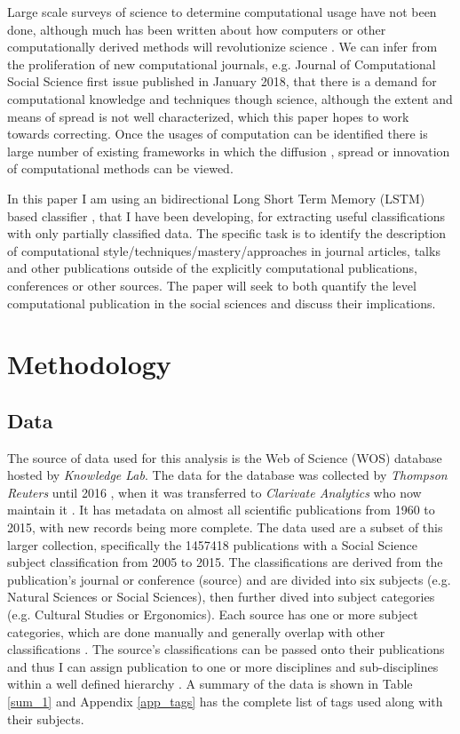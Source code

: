 \documentclass[12pt, a4paper]{article}
\begin{document}
Large scale surveys of science to determine computational usage have not been done, although much has been written about how computers or other computationally derived methods will revolutionize science \citep[e.g.][]{de1997computer, anderson2008end,  provost2013data, john2014big}. We can infer from the proliferation of new computational journals, e.g. Journal of Computational Social Science first issue published in January 2018, that there is a demand for computational knowledge and techniques though science, although the extent and means of spread is not well characterized, which this paper hopes to work towards correcting. Once the usages of computation can be identified there is large number of existing frameworks in which the diffusion \citep{griliches1960hybrid}, spread \citep{padgett1993robust} or innovation \citep{foster2015tradition} of computational methods can be viewed.

In this paper I am using an bidirectional Long Short Term Memory (LSTM) based classifier \cite{graves2005framewise}, that I have been developing, for extracting useful classifications with only partially classified data. The specific task is to identify the description of computational style/techniques/mastery/approaches in journal articles, talks and other publications outside of the explicitly computational publications, conferences or other sources. The paper will seek to both quantify the level computational publication in the social sciences and discuss their implications.


\section{Methodology}

\subsection{Data}

The source of data used for this analysis is the  Web of Science (WOS) database hosted by \textit{Knowledge Lab}. The data for the database was collected by \textit{Thompson Reuters} until 2016 , when it was transferred to \textit{Clarivate Analytics} who now maintain it \citep{clarivate}. It has metadata on almost all scientific publications from 1960 to 2015, with new records being more complete. The data used are a subset of this larger collection, specifically the \num{1457418} publications with a Social Science subject classification from 2005 to 2015. The classifications are derived from the publication's journal or conference (source) \citep{kottawos} and are divided into six subjects (e.g. Natural Sciences or Social Sciences), then further dived into subject categories (e.g. Cultural Studies or Ergonomics). Each source has one or more subject categories, which are done manually and generally overlap with other classifications \citep{efremenkova2016comparison}. The source's classifications can be passed onto their publications and thus I can assign publication to one or more disciplines and  sub-disciplines within a well defined hierarchy \citep{wossubjects}. A summary of the data is shown in Table \ref{sum_1} and Appendix \ref{app_tags} has the complete list of tags used along with their subjects.
\end{document}
